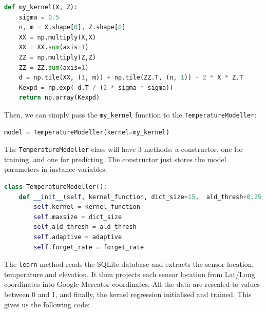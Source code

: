 \documentclass[11pt]{article}
\begin{document}
\begin{lstlisting}[language=Python]
def my_kernel(X, Z):
    sigma = 0.5
    n, m = X.shape[0], Z.shape[0]
    XX = np.multiply(X,X)
    XX = XX.sum(axis=1)
    ZZ = np.multiply(Z,Z)
    ZZ = ZZ.sum(axis=1)
    d = np.tile(XX, (1, m)) + np.tile(ZZ.T, (n, 1)) - 2 * X * Z.T
    Kexpd = np.exp(-d.T / (2 * sigma * sigma))
    return np.array(Kexpd)
\end{lstlisting}

Then, we can simply pass the \texttt{my\_kernel} function to the \texttt{TemperatureModeller}:
\begin{lstlisting}[language=Python]
model = TemperatureModeller(kernel=my_kernel)
\end{lstlisting}


The \texttt{TemperatureModeller} class will have 3 methods: a constructor, one for training, and one for predicting. The constructor just stores the model parameters in instance variables:

\begin{lstlisting}[language=Python]
class TemperatureModeller():
    def __init__(self, kernel_function, dict_size=15,  ald_thresh=0.25, adaptive=True, forget_rate=0.0):
        self.kernel = kernel_function
        self.maxsize = dict_size
        self.ald_thresh = ald_thresh
        self.adaptive = adaptive
        self.forget_rate = forget_rate
\end{lstlisting}

The \texttt{learn} method reads the SQLite database and extracts the sensor location, temperature and elevation. It then projects each sensor location from Lat/Long coordinates into Google Mercator coordinates. All the data are rescaled to values between 0 and 1, and finally, the kernel regression initialised and trained. This gives us the following code:
\end{document}
